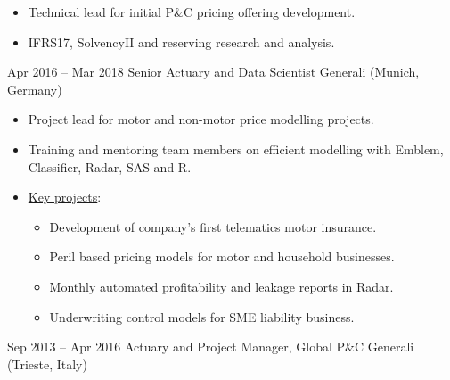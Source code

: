 \documentclass[a4paper,]{fortysecondscv}
\begin{document}
\begin{cvtable}
{        \begin{itemize}[nosep, leftmargin=0pt] %
            \item Technical lead for initial P\&C pricing offering development.
            \item IFRS17, SolvencyII and reserving research and analysis.
        \end{itemize}
    }
    \vspace{\topsep}
    \cvitem
    {Apr 2016 -- Mar 2018}
    {Senior Actuary and Data Scientist}
    {Generali (Munich, Germany)}
    {
        \vspace{-\topsep}
        \begin{itemize}[nosep, leftmargin=0pt] %
            \item Project lead for motor and non-motor price modelling projects.
            \item Training and mentoring team members on efficient modelling with Emblem, Classifier, Radar, SAS and R.
            \item \underline{Key projects}:
                  \begin{itemize}
                      \item Development of company's first telematics motor insurance.
                      \item Peril based pricing models for motor and household businesses.
                      \item Monthly automated profitability and leakage reports in Radar.
                      \item Underwriting control models for SME liability business.
                  \end{itemize}
        \end{itemize}
    }
    \vspace{\topsep}
    \cvitem
    {Sep 2013 -- Apr 2016}
    {Actuary and Project Manager, Global P\&C}
    {Generali (Trieste, Italy)}
    {
        \vspace{-\topsep}
}
\end{cvtable}
\end{document}
